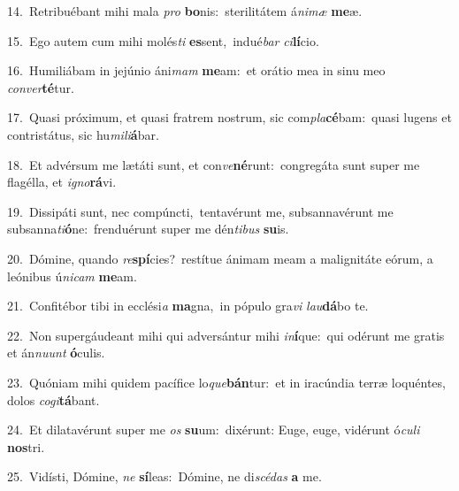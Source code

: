 {\numbfont\textcolor{\numbcolor}{14.}}~Retribuébant mihi mala \textit{pro} \textbf{bo}\-nis:~\star sterilitátem á\-\textit{ni}\-\textit{mæ} \textbf{me}\-æ.\par
{\numbfont\textcolor{\numbcolor}{15.}}~Ego autem cum mihi molés\textit{ti} \textbf{es}\-sent,~\star indué\textit{bar} \textit{ci}\-\textbf{lí}cio.\par
{\numbfont\textcolor{\numbcolor}{16.}}~Humiliábam in jejúnio áni\textit{mam} \textbf{me}\-am:~\star et orátio mea in sinu meo \textit{con}\-\textit{ver}\textbf{té}tur.\par
{\numbfont\textcolor{\numbcolor}{17.}}~Quasi próximum, et quasi fratrem nostrum, sic com\-\textit{pla}\-\textbf{cé}bam:~\star quasi lugens et contristátus, sic hu\-\textit{mi}\-\textit{li}\textbf{á}bar.\par
{\numbfont\textcolor{\numbcolor}{18.}}~Et advérsum me lætáti sunt, et con\-\textit{ve}\-\textbf{né}runt:~\star congregáta sunt super me flagélla, et \textit{i}\-\textit{gno}\textbf{rá}vi.\par
{\numbfont\textcolor{\numbcolor}{19.}}~Dissipáti sunt, nec compúncti,~\dagger tentavérunt me, subsannavérunt me subsanna\-\textit{ti}\-\textbf{ó}ne:~\star frenduérunt super me dén\-\textit{ti}\-\textit{bus} \textbf{su}\-is.\par
{\numbfont\textcolor{\numbcolor}{20.}}~Dómine, quando \textit{re}\-\textbf{spí}cies?~\star restítue ánimam meam a malignitáte eórum, a leónibus ú\-\textit{ni}\-\textit{cam} \textbf{me}\-am.\par
{\numbfont\textcolor{\numbcolor}{21.}}~Confitébor tibi in ecclési\textit{a} \textbf{ma}\-gna,~\star in pópulo gra\textit{vi} \textit{lau}\-\textbf{dá}bo te.\par
{\numbfont\textcolor{\numbcolor}{22.}}~Non supergáudeant mihi qui adversántur mihi \textit{in}\-\textbf{í}que:~\star qui odérunt me gratis et án\-\textit{nu}\-\textit{unt} \textbf{ó}\-culis.\par
{\numbfont\textcolor{\numbcolor}{23.}}~Quóniam mihi quidem pacífice lo\-\textit{que}\-\textbf{bán}tur:~\star et in iracúndia terræ loquéntes, dolos \textit{co}\-\textit{gi}\textbf{tá}bant.\par
{\numbfont\textcolor{\numbcolor}{24.}}~Et dilatavérunt super me \textit{os} \textbf{su}\-um:~\star dixérunt: Euge, euge, vidérunt ó\-\textit{cu}\-\textit{li} \textbf{nos}\-tri.\par
{\numbfont\textcolor{\numbcolor}{25.}}~Vidísti, Dómine, \textit{ne} \textbf{sí}\-leas:~\star Dómine, ne di\-\textit{scé}\-\textit{das} \textbf{a} me.\par
